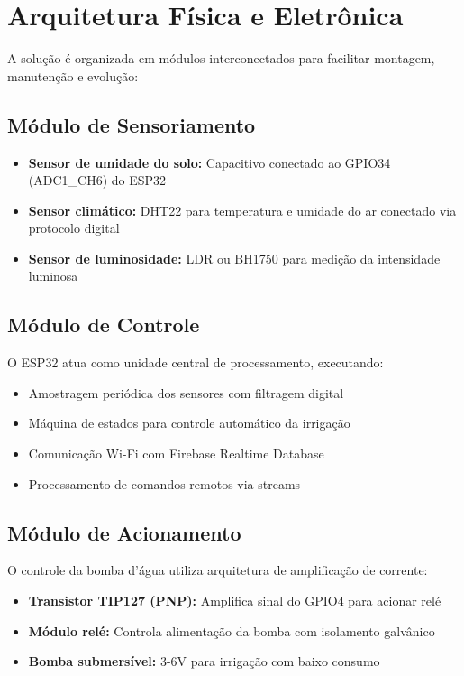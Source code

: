 \documentclass[twoside,english,brazilian]{UNISINOSmonografia}
\begin{document}
\section{Arquitetura Física e Eletrônica}

A solução é organizada em módulos interconectados para facilitar montagem, manutenção e evolução:

\subsection{Módulo de Sensoriamento}
\begin{itemize}
    \item \textbf{Sensor de umidade do solo:} Capacitivo conectado ao GPIO34 (ADC1\_CH6) do ESP32
    \item \textbf{Sensor climático:} DHT22 para temperatura e umidade do ar conectado via protocolo digital
    \item \textbf{Sensor de luminosidade:} LDR ou BH1750 para medição da intensidade luminosa
\end{itemize}

\subsection{Módulo de Controle}
O ESP32 atua como unidade central de processamento, executando:
\begin{itemize}
    \item Amostragem periódica dos sensores com filtragem digital
    \item Máquina de estados para controle automático da irrigação
    \item Comunicação Wi-Fi com Firebase Realtime Database
    \item Processamento de comandos remotos via streams
\end{itemize}

\subsection{Módulo de Acionamento}
O controle da bomba d'água utiliza arquitetura de amplificação de corrente:
\begin{itemize}
    \item \textbf{Transistor TIP127 (PNP):} Amplifica sinal do GPIO4 para acionar relé
    \item \textbf{Módulo relé:} Controla alimentação da bomba com isolamento galvânico
    \item \textbf{Bomba submersível:} 3-6V para irrigação com baixo consumo
\end{itemize}
\end{document}
